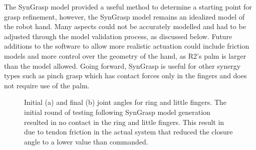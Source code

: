 \documentclass[runningheads,a4paper]{llncs}
\begin{document}
The SynGrasp model provided a useful method to determine a starting point for grasp refinement, however, the SynGrasp model remains an idealized model of the robot hand. Many aspects could not be accurately modelled and had to be adjusted through the model validation process, as discussed below. Future additions to the software to allow more realistic actuation could include friction models and more control over the geometry of the hand, as R2's palm is larger than the model allowed. Going forward, SynGrasp is useful for other synergy types such as pinch grasp which has contact forces only in the fingers and does not require use of the palm. 

\begin{figure}[!b]
\centering
\null\hfill
	\quad
	\hfill
	\hfill\null
  \caption{Initial (a) and final (b) joint angles for ring and little fingers. The initial round of testing following SynGrasp model generation resulted in no contact in the ring and little fingers.  This result in due to tendon friction in the actual system that reduced the closure angle to a lower value than commanded.}%
\label{pinkymodels}%
\end{figure}
\end{document}
